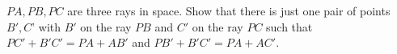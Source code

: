 $PA, PB, PC$ are three rays in space. Show that there is just one pair of points $B', C$' with $B'$ on the ray $PB$ and $C'$ on the ray $PC$ such that $PC' + B'C' = PA + AB'$ and $PB' + B'C' = PA + AC'$.